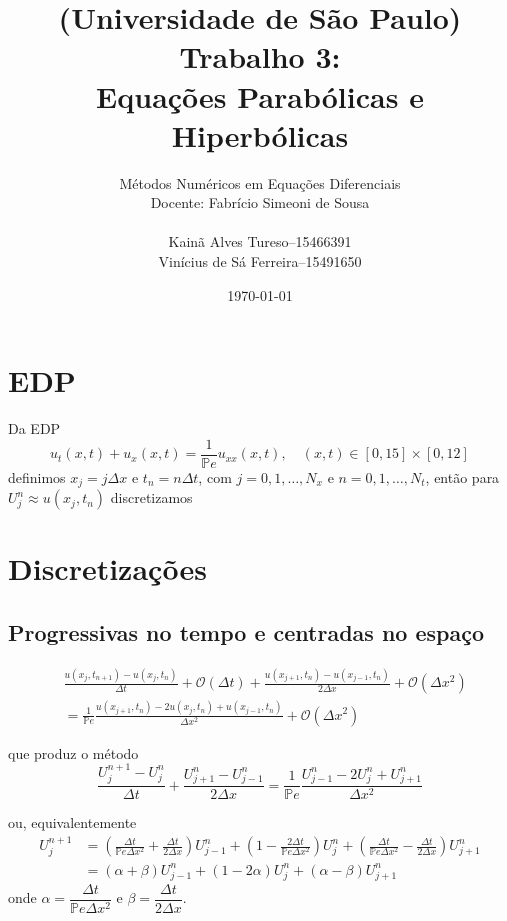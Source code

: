 \documentclass[12pt, a4paper]{article}
\title{(Universidade de São Paulo)\\
Trabalho 3:\\Equações Parabólicas e Hiperbólicas}
\author{Métodos Numéricos em Equações Diferenciais\\
Docente: Fabrício Simeoni de Sousa\\[.2cm]
\begin{tabular}{r@{\ }c@{\ }l}
    Kainã Alves Tureso      &-- &15466391\\
    Vinícius de Sá Ferreira &-- &15491650
\end{tabular}}
\date{\today}
\newcommand{\bb}[1]{\mathbb{#1}}
\newcommand{\D}[1]{\Delta#1}
\renewcommand{\O}[1]{\mathcal{O} (#1)}
\begin{document}
    \maketitle

    \section{EDP}
    Da EDP
    \begin{equation}
        u_t(x,t) + u_x(x,t) = \frac{1}{\bb{P}e} u_{xx}(x,t), \quad (x,t) \in [0,15] \times [0,12]
    \end{equation}
    definimos $x_j = j\D{x}$ e $t_n = n\D{t}$, com $j = 0,1,\ldots,N_x$ e $n = 0,1,\ldots,N_t$, então para $U_j^n \approx u(x_j,t_n)$ discretizamos

    \section{Discretizações}
    \subsection{Progressivas no tempo e centradas no espaço}
    \begin{equation}
        \begin{split}
            &\frac{u(x_j,t_{n+1})-u(x_j,t_n)}{\D{t}} + \O{\D{t}} + \frac{u(x_{j+1},t_n)-u(x_{j-1},t_n)}{2\D{x}} + \O{\D{x}^2}
            \\&= \frac{1}{\bb{P}e} \frac{u(x_{j+1},t_n)-2u(x_j,t_n)+u(x_{j-1},t_n)}{\D{x}^2} + \O{\D{x}^2}
        \end{split}
    \end{equation}

    que produz o método
    \begin{equation}
        \frac{U_j^{n+1}-U_j^n}{\D{t}} + \frac{U_{j+1}^n-U_{j-1}^n}{2\D{x}} = \frac{1}{\bb{P}e} \frac{U_{j-1}^n-2U_j^n+U_{j+1}^n}{\D{x}^2}
    \end{equation}

    ou, equivalentemente
    \begin{equation}
        \begin{split}
            U_j^{n+1} &= \left(\frac{\D{t}}{\bb{P}e\D{x^2}}+\frac{\D{t}}{2\D{x}}\right)U_{j-1}^n + \left(1-\frac{2\D{t}}{\bb{P}e\D{x^2}}\right)U_j^n + \left(\frac{\D{t}}{\bb{P}e\D{x^2}}-\frac{\D{t}}{2\D{x}}\right)U_{j+1}^n\\[.2cm]
            &= (\alpha+\beta)U_{j-1}^n + (1-2\alpha)U_j^n + (\alpha-\beta)U_{j+1}^n
        \end{split} \label{eq:centradas}
    \end{equation}
    onde $\alpha = \dfrac{\D{t}}{\bb{P}e\D{x^2}}$ e $\beta = \dfrac{\D{t}}{2\D{x}}$.
\end{document}
